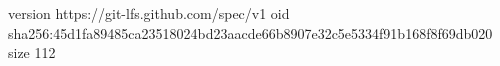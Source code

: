 version https://git-lfs.github.com/spec/v1
oid sha256:45d1fa89485ca23518024bd23aacde66b8907e32c5e5334f91b168f8f69db020
size 112
